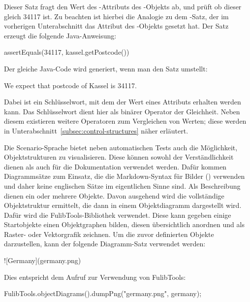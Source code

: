 Dieser Satz fragt den Wert des -Attributs des -Objekts ab, und prüft ob dieser gleich 34117 ist.
Zu beachten ist hierbei die Analogie zu dem -Satz, der im vorherigen Unterabschnitt das Attribut des -Objekts gesetzt hat.
Der Satz erzeugt die folgende Java-Anweisung:

\begin{jcodeblock}
    assertEquals(34117, kassel.getPostcode())
\end{jcodeblock}

Der gleiche Java-Code wird generiert, wenn man den Satz umstellt:

\begin{codeblock}
    We expect that postcode of Kassel is 34117.
\end{codeblock}

Dabei ist  ein Schlüsselwort, mit dem der Wert eines Attributs erhalten werden kann.
Das Schlüsselwort  dient hier als binärer Operator der Gleichheit.
Neben diesem existieren weitere Operatoren zum Vergleichen von Werten;
diese werden in Unterabschnitt~\ref{subsec:control-structures} näher erläutert.

Die Scenario-Sprache bietet neben automatischen Tests auch die Möglichkeit, Objektstrukturen zu visualisieren.
Diese können sowohl der Verständlichkeit dienen als auch für die Dokumentation verwendet werden.
Dafür kommen Diagrammsätze zum Einsatz, die die Markdown-Syntax für Bilder () verwenden und daher keine englischen Sätze im eigentlichen Sinne sind.
Als Beschreibung dienen ein oder mehrere Objekte.
Davon ausgehend wird die vollständige Objektstruktur ermittelt, die dann in einem Objektdiagramm dargestellt wird.
Dafür wird die FulibTools\cite{fulibTools}-Bibliothek verwendet.
Diese kann gegeben einige Startobjekte einen Objektgraphen bilden, diesen übersichtlich anordnen und als Raster- oder Vektorgrafik zeichnen.
Um die zuvor definierten Objekte darzustellen, kann der folgende Diagramm-Satz verwendet werden:

\begin{mdcodeblock}
    ![Germany](germany.png)
\end{mdcodeblock}

Dies entspricht dem Aufruf zur Verwendung von FulibTools:

\begin{jcodeblock}
    FulibTools.objectDiagrams().dumpPng("germany.png", germany);
\end{jcodeblock}

